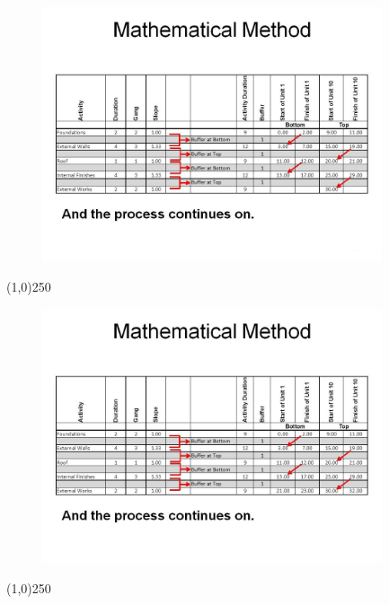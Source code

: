 \begin{frame}
\begin{figure}
	\centering
		\includegraphics[width = 10.0cm]{oldnotes/Slide294.jpg}
\end{figure}
\end{frame}
\begin{center}\line(1,0){250}\end{center}








\begin{frame}
\begin{figure}
	\centering
		\includegraphics[width = 10.0cm]{oldnotes/Slide295.jpg}
\end{figure}
\end{frame}
\begin{center}\line(1,0){250}\end{center}








